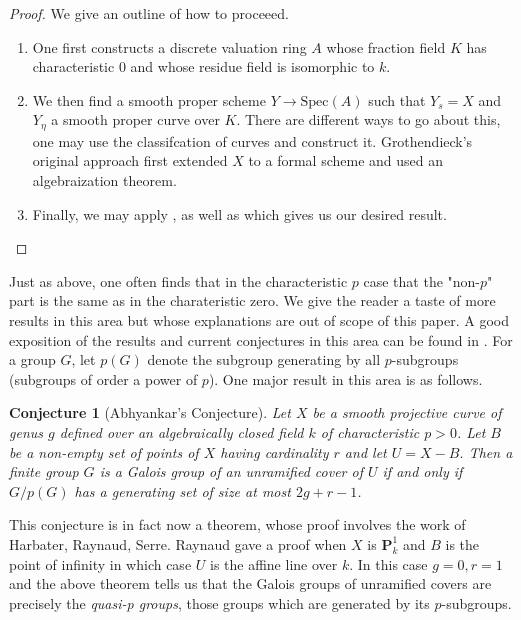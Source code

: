\documentclass{article}
\theoremstyle{definition}
\theoremstyle{remark}
\theoremstyle{plain}
\newtheorem{conjecture}[theorem]{Conjecture}
\begin{document}
\begin{proof} We give an outline of how to proceeed.
	\begin{enumerate}
		\item One first constructs a discrete valuation ring $A$ whose fraction field $K$ has characteristic 0 and whose residue field is isomorphic to $k$.
\item We then find a smooth proper scheme $Y \to \text{Spec}(A)$ such that $Y_{s} = X$ and $Y_{\eta}$ a smooth proper curve over $K$.
	There are different ways to go about this, one may use the classifcation of curves and construct it.
	Grothendieck's original approach first extended $X$ to a formal scheme and used an algebraization theorem.
\item Finally, we may apply , as well as  which gives us our desired result. 
	\end{enumerate}
	
\end{proof}

Just as above, one often finds that in the characteristic $p$ case that the "non-$p$" part is the same as in the charateristic zero.
We give the reader a taste of more results in this area but whose explanations are out of scope of this paper.
A good exposition of the results and current conjectures in this area can be found in  \cite{abhyankar}.
For a group $G$, let $p(G)$ denote the subgroup generating by all $p$-subgroups (subgroups of order a power of $p$).
One major result in this area is as follows.

\begin{conjecture}[Abhyankar's Conjecture]
	Let $X$ be a smooth projective curve of genus $g$ defined over an algebraically closed field $k$ of characteristic $p > 0$.
	Let $B$ be a non-empty set of points of $X$ having cardinality $r$ and let $U = X - B$.
	Then a finite group $G$ is a Galois group of an unramified cover of $U$ if and only if $G/p(G)$ has a generating set of size at most $2g + r -1$.
\end{conjecture}

This conjecture is in fact now a theorem, whose proof involves the work of Harbater, Raynaud, Serre.
Raynaud gave a proof when $X$ is $\textbf{P}_k^1$ and $B$ is the point of infinity in which case $U$ is the affine line over $k$.
In this case $g = 0, r = 1$ and the above theorem tells us that the Galois groups of unramified covers are precisely the \textit{quasi-p groups}, those groups which are generated by its $p$-subgroups.






\newpage


\end{document}
